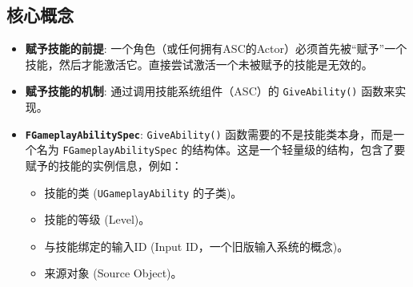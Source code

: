 \documentclass[10pt,CJKmath]{zhbook-v1}
\newcommand{\il}[1]{\texttt{#1}}%
\begin{document}
\subsection{核心概念}
\begin{itemize}
    \item \textbf{赋予技能的前提}: 一个角色（或任何拥有ASC的Actor）必须首先被“赋予”一个技能，然后才能激活它。直接尝试激活一个未被赋予的技能是无效的。
    \item \textbf{赋予技能的机制}: 通过调用技能系统组件（ASC）的 \texttt{GiveAbility()} 函数来实现。
    \item \textbf{\texttt{FGameplayAbilitySpec}}: \texttt{GiveAbility()} 函数需要的不是技能类本身，而是一个名为 \il{FGameplayAbilitySpec} 的结构体。这是一个轻量级的结构，包含了要赋予的技能的实例信息，例如：
    \begin{itemize}
        \item 技能的类 (\texttt{UGameplayAbility} 的子类)。
        \item 技能的等级 (Level)。
        \item 与技能绑定的输入ID (Input ID，一个旧版输入系统的概念)。
        \item 来源对象 (Source Object)。
    \end{itemize}
\end{itemize}
\end{document}
